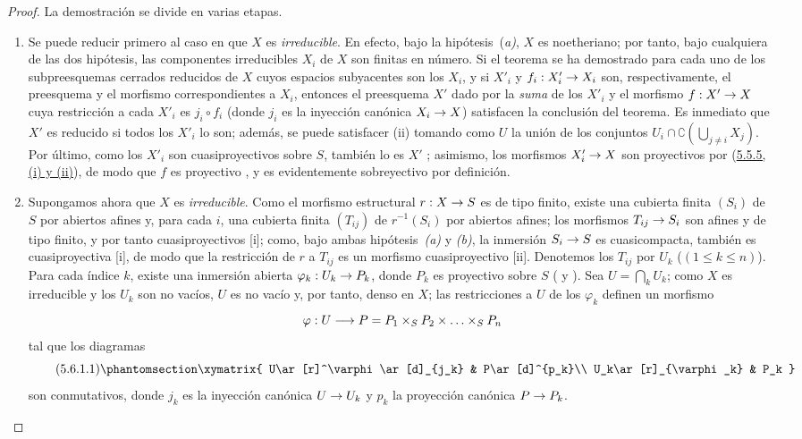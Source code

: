 \documentclass[oneside,10pt]{amsart}
\makeatletter
\renewcommand{\leq}{\leqslant}
\newcommand{\ega@arrow}[2]{\mathchoice{#1}{#2}{#2}{#2}}
\renewcommand{\to}{\ega@arrow{\longrightarrow}{\rightarrow}}
\newcommand{\oldpage}[2][]{\marginnote{\normalfont\footnotesize\textbf{#1}~|~#2}\ignorespaces}
\let\EGAOriginalLabel\label
\renewcommand{\label}[1]{\phantomsection\EGAOriginalLabel{#1}}
\makeatother
\begin{document}
\begin{proof}
La demostración se divide en varias etapas.
\begin{enumerate}
  \item[(A)] Se puede reducir primero al caso en que $X$ es \emph{irreducible}.
    En efecto, bajo la hipótesis~(\emph{a)}, $X$ es noetheriano; por tanto, bajo cualquiera de las dos hipótesis, las componentes irreducibles $X_i$ de $X$ son finitas en número.
    Si el teorema se ha demostrado para cada uno de los subpreesquemas cerrados reducidos de $X$ cuyos espacios subyacentes son los $X_i$, y si $X'_i$ y $f_i:X'_i\to X_i$ son, respectivamente, el preesquema y el morfismo correspondientes a $X_i$, entonces el preesquema $X'$ dado por la \emph{suma} de los $X'_i$ y el morfismo $f:X'\to X$ cuya restricción a cada $X'_i$ es $j_i\circ f_i$ (donde $j_i$ es la inyección canónica $X_i\to X$) satisfacen la conclusión del teorema.
    Es inmediato que $X'$ es reducido si todos los $X'_i$ lo son; además, se puede satisfacer (ii) tomando como $U$ la unión de los conjuntos $U_i\cap\complement(\bigcup_{j\neq i}X_j)$.
    Por último, como los $X'_i$ son cuasiproyectivos sobre $S$, también lo es $X'$
\oldpage[II]{107}
    ; asimismo, los morfismos $X'_i\to X$ son proyectivos por (\hyperref[II.5.5.5-fr]{5.5.5, (i) y (ii)}), de modo que $f$ es proyectivo , y es evidentemente sobreyectivo por definición.

  \item[(B)] Supongamos ahora que $X$ es \emph{irreducible}.
    Como el morfismo estructural $r:X\to S$ es de tipo finito, existe una cubierta finita $(S_i)$ de $S$ por abiertos afines y, para cada $i$, una cubierta finita $(T_{ij})$ de $r^{-1}(S_i)$ por abiertos afines; los morfismos $T_{ij}\to S_i$ son afines y de tipo finito, y por tanto cuasiproyectivos [i];
    como, bajo ambas hipótesis~\emph{(a)} y \emph{(b)}, la inmersión $S_i\to S$ es cuasicompacta, también es cuasiproyectiva [i], de modo que la restricción de $r$ a $T_{ij}$ es un morfismo cuasiproyectivo [ii].
    Denotemos los $T_{ij}$ por $U_k$ ($(1\leq k\leq n)$).
    Para cada índice $k$, existe una inmersión abierta $\varphi_k:U_k\to P_k$, donde $P_k$ es proyectivo sobre $S$ ( y ).
    Sea $U=\bigcap_kU_k$; como $X$ es irreducible y los $U_k$ son no vacíos, $U$ es no vacío y, por tanto, denso en $X$; las restricciones a $U$ de los $\varphi_k$ definen un morfismo
    \[
\varphi:U\to P=P_1\times_SP_2\times\ldots\times_SP_n
\]
    tal que los diagramas
    \[
\tag{5.6.1.1}
\label{II.5.6.1.1-fr}
\xymatrix{
U\ar[r]^\varphi\ar[d]_{j_k} & P\ar[d]^{p_k}\\
U_k\ar[r]_{\varphi_k} & P_k
}
\]
    son conmutativos, donde $j_k$ es la inyección canónica $U\to U_k$ y $p_k$ la proyección canónica $P\to P_k$.


\end{enumerate}
\end{proof}
\end{document}
